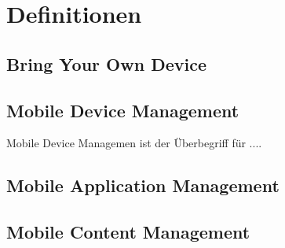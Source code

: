 \chapter{Definitionen}
\label{cha:Definitionen}

\section{Bring Your Own Device}
\section{Mobile Device Management}
Mobile Device Managemen ist der Überbegriff für ....


\section{Mobile Application Management}
\section{Mobile Content Management}

